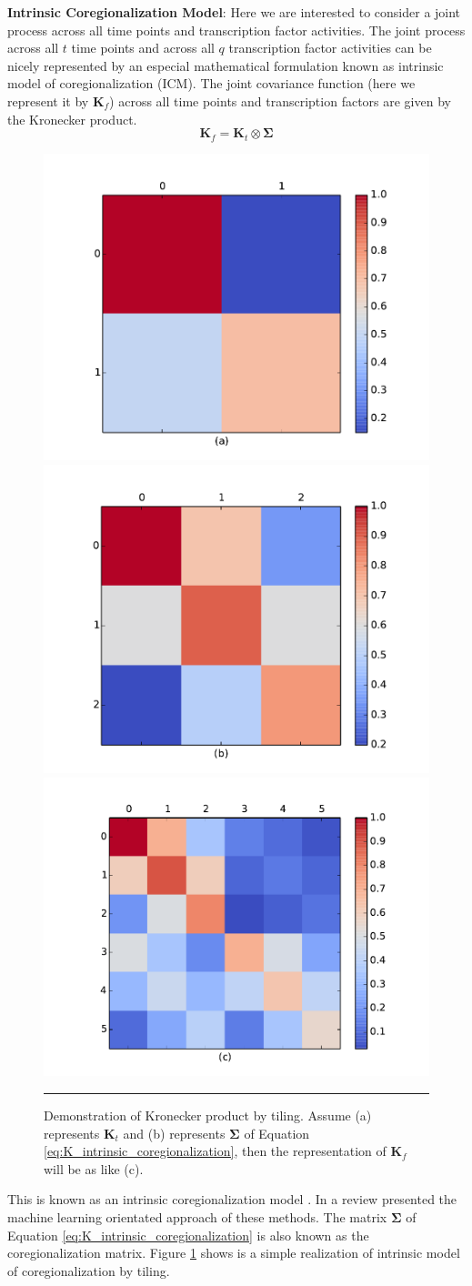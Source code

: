 \textbf{Intrinsic Coregionalization Model}: Here we are interested to consider a joint process across all time points and transcription factor activities. The joint process across all $t$ time points and across all $q$ transcription factor activities can be nicely represented by an especial mathematical formulation known as intrinsic model of coregionalization (ICM). The joint covariance function (here we represent it by $\mathbf{K}_f$) across all time points and transcription factors are given by the Kronecker product.
\begin{equation} \label{eq:K_intrinsic_coregionalization}
\mathbf{K}_f = \mathbf{K}_t \otimes \boldsymbol{\Sigma}
\end{equation}

\begin{figure}[!htbp]
	\centering
	\includegraphics[width=.14\textwidth,keepaspectratio]{diagrams/a.pdf}
	\includegraphics[width=.2\textwidth,keepaspectratio]{diagrams/b.pdf}
	\includegraphics[width=.3\textwidth,keepaspectratio]{diagrams/c.pdf}
	\rule{25em}{0.5pt}
	\caption[Demonstration of Kronecker product by tiling]{Demonstration of Kronecker product by tiling. Assume (a) represents $\textbf{K}_t$ and (b) represents $\boldsymbol{\Sigma}$ of Equation \ref{eq:K_intrinsic_coregionalization}, then the representation of $\textbf{K}_f$ will be as like (c).}
	\label{fig:kron_prod}
\end{figure}
This is known as an intrinsic coregionalization model 
\cite{Wackernagel:2003}
. In a review  \cite{Alvarez:2012} presented the machine learning orientated approach of these methods. The matrix $\boldsymbol{\Sigma}$ of Equation \ref{eq:K_intrinsic_coregionalization} is also known as the coregionalization matrix. Figure \ref{fig:kron_prod} shows is a simple realization of intrinsic model of coregionalization by tiling.


